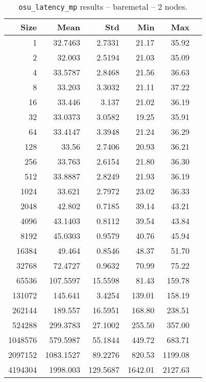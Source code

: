 \begin{table}[htbp]
\begin{minipage}{.48\textwidth}
    \centering
    \footnotesize
  \begin{tabular}{rrrrrr}
	\toprule
	\textbf{Size} & \textbf{Mean} & \textbf{Std} & \textbf{Min} & \textbf{Max}	\\
	\midrule
	1	&	32.7463   	&	2.7331	&	21.17	&	35.92	\\
	2	&	32.003   	&	2.5194	&	21.03	&	35.09	\\
	4	&	33.5787   	&	2.8468	&	21.56	&	36.63	\\
	8	&	33.203   	&	3.3032	&	21.11	&	37.22	\\
	16	&	33.446   	&	3.137	&	21.02	&	36.19	\\
	32	&	33.0373   	&	3.0582	&	19.25	&	35.91	\\
	64	&	33.4147   	&	3.3948	&	21.24	&	36.29	\\
	128	&	33.56   	&	2.7406	&	20.93	&	36.21	\\
	256	&	33.763   	&	2.6154	&	21.80	&	36.30	\\
	512	&	33.8887   	&	2.8249	&	21.93	&	36.19	\\
	1024	&	33.621   	&	2.7972	&	23.02	&	36.33	\\
	2048	&	42.802   	&	0.7185	&	39.14	&	43.21	\\
	4096	&	43.1403   	&	0.8112	&	39.54	&	43.84	\\
	8192	&	45.0303   	&	0.9579	&	40.76	&	45.94	\\
	16384	&	49.464   	&	0.8546	&	48.37	&	51.70	\\
	32768	&	72.4727   	&	0.9632	&	70.99	&	75.22	\\
	65536	&	107.5597   	&	15.5598	&	81.43	&	159.78	\\
	131072	&	145.641   	&	3.4254	&	139.01	&	158.19	\\
	262144	&	189.557   	&	16.5951	&	168.80	&	238.51	\\
	524288	&	299.3783   	&	27.1002	&	255.50	&	357.00	\\
	1048576	&	579.5987   	&	55.1844	&	449.72	&	683.71	\\
	2097152	&	1083.1527   	&	89.2276	&	820.53	&	1199.08	\\
	4194304	&	1998.003   	&	129.5687	&	1642.01	&	2127.63	\\
	\bottomrule
	\end{tabular}
  \caption{\texttt{osu\_latency\_mp} results -- baremetal -- 2 nodes.}
  \label{tab:latency-mp-baremetal-2nodes}
  \end{minipage}
\end{table}



